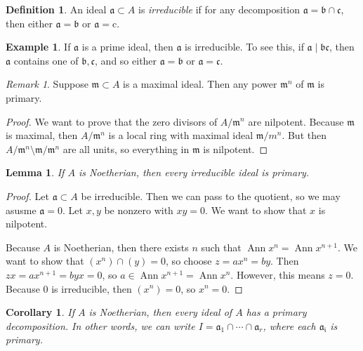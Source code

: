 \documentclass[leqno, openany]{memoir}
\newtheorem{cor}[thm]{Corollary}
\newtheorem{lem}[thm]{Lemma}
\theoremstyle{definition}
\newtheorem{defn}[thm]{Definition}
\newtheorem{exm}[thm]{Example}
\theoremstyle{remark}
\newtheorem{rmk}[thm]{Remark}
\theoremstyle{plain}
\theoremstyle{definition}
\theoremstyle{remark}
\newcommand{\mf}[1]{\mathfrak{#1}}
\newcommand{\mr}[1]{\mathrm{#1}}
\begin{document}
\begin{defn} An ideal $\mf{a} \subset A$ is \textit{irreducible} if for any
decomposition $\mf{a} = \mf{b} \cap \mf{c}$, then either $\mf{a} = \mf{b}$ or
$\mf{a} = \mr{c}$.  \end{defn}

\begin{exm} If $\mf{a}$ is a prime ideal, then $\mf{a}$ is irreducible. To see
this, if $\mf{a} \mid \mf{bc}$, then $\mf{a}$ contains one of $\mf{b}, \mf{c}$,
and so either $\mf{a} = \mf{b}$ or $\mf{a} = \mf{c}$.  \end{exm}

\begin{rmk} Suppose $\mf{m} \subset A$ is a maximal ideal. Then any power
$\mf{m}^n$ of $\mf{m}$ is primary.  \end{rmk}

\begin{proof} We want to prove that the zero divisors of $A / \mf{m}^n$ are
    nilpotent. Because $\mf{m}$ is maximal, then $A / \mf{m}^n$ is a local ring
    with maximal ideal $\mf{m} / m^n$. But then $A / \mf{m}^n \setminus \mf{m}
    / \mf{m}^n$ are all units, so everything in $\mf{m}$ is nilpotent.
\end{proof}

\begin{lem} If $A$ is Noetherian, then every irreducible ideal is primary.
\end{lem}

\begin{proof} Let $\mf{a} \subset A$ be irreducible. Then we can pass to the
    quotient, so we may asusme $\mf{a} = 0$. Let $x,y$ be nonzero with $xy =
    0$. We want to show that $x$ is nilpotent.

    Because $A$ is Noetherian, then there exists $n$ such that
$\operatorname{Ann} x^n = \operatorname{Ann} x^{n+1}$. We want to show that
$(x^n) \cap (y) = 0$, so choose $z = ax^n = by$. Then $zx = ax^{n+1} = byx =
0$, so $a \in \operatorname{Ann} x^{n+1} = \operatorname{Ann} x^n$. However,
this means $z = 0$. Because $0$ is irreducible, then $(x^n) = 0$, so $x^n = 0$.
\end{proof}

\begin{cor} If $A$ is Noetherian, then every ideal of $A$ has a primary
decomposition. In other words, we can write $I = \mf{a}_1 \cap  \cdots \cap
\mathfrak{a}_r$, where each $\mf{a_i}$ is primary.  \end{cor}
\end{document}
